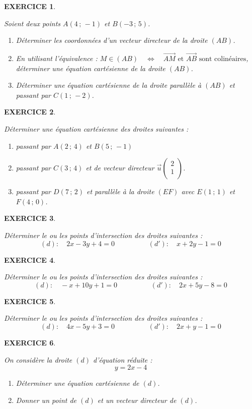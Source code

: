\documentclass[a4paper]{article}   %
\renewcommand{\(}{\left(}
\renewcommand{\)}{\right)}
\newtheorem{EXO}{\large EXERCICE }
\newenvironment{EX}   { \setcounter{ques}{0} \begin{EXO} \hrulefill ~\vspace{0.3cm}

\normalfont}    {\end{EXO} \medskip}
\def\v{\overrightarrow}	%
\newcommand{\ssi}{\quad \Leftrightarrow \quad}	%
\begin{document}
\begin{EX} Soient deux points $A(4\,;\,-1)$ et $B(-3\,;\,5)$.
\begin{enumerate}
\item Déterminer les coordonnées d'un vecteur directeur de la droite $(AB)$.
\item En utilisant l'équivalence : $M \in (AB) \ssi \v{AM} \text{ et } \v{AB} \text{ sont colinéaires}$, déterminer une équation cartésienne de la droite $(AB)$.
\item Déterminer une équation cartésienne de la droite parallèle à $(AB)$ et passant par $C(1\,;\,-2)$.
\end{enumerate}

\end{EX}

\begin{EX}
Déterminer une équation cartésienne des droites suivantes :
\begin{enumerate}
\item passant par $A(2\,;\,4)$ et $B(5 \,;\,-1)$
\item passant par $C(3\,;\,4)$ et de vecteur directeur $\v{u}\left (\begin{array}{c}
2	 \\
	1 \\
\end{array} \right)$.
\item passant par $D(7\,;\,2)$ et parallèle à la droite $(EF)$ avec $E(1\,;\,1)$ et $F(4\,;\, 0)$.
\end{enumerate}

\end{EX}

\begin{EX} Déterminer le ou les points d'intersection des droites suivantes : 
$$(d):\quad 2x-3y+4=0 \hspace{2cm} (d'):\quad x+2y-1=0$$

\end{EX}
\begin{EX} Déterminer le ou les points d'intersection des droites suivantes : 
$$(d):\quad -x+10y+1=0 \hspace{2cm} (d'):\quad 2x+5y-8=0$$

\end{EX}
\begin{EX} Déterminer le ou les points d'intersection des droites suivantes : 
$$(d):\quad 4x-5y+3=0 \hspace{2cm} (d'):\quad 2x+y-1=0$$

\end{EX}
\begin{EX} On considère la droite $(d)$ d'équation réduite : 
$$y=2x-4$$
\begin{enumerate}
\item Déterminer une équation cartésienne de $(d)$.
\item Donner un point de $(d)$ et un vecteur directeur de $(d)$.
\end{enumerate}
\end{EX}
\end{document}
